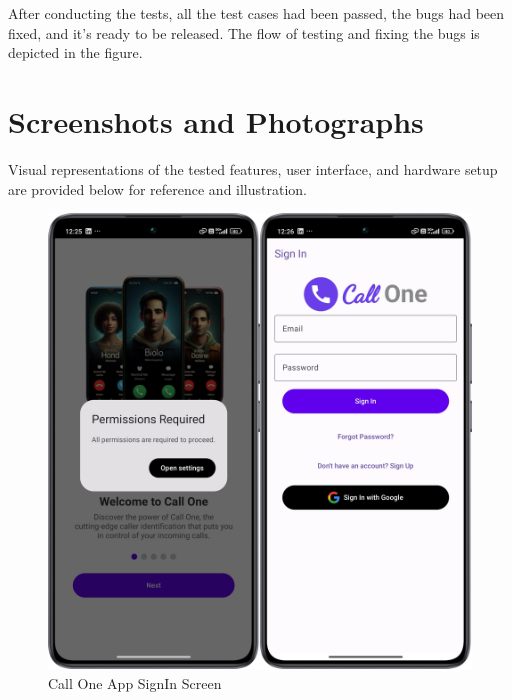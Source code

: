 After conducting the tests, all the test cases had been passed, the bugs had been fixed, and it's ready to be released.
The flow of testing and fixing the bugs is depicted in the figure.

\section{Screenshots and Photographs}\label{sec:screenshots-and-photographs}

Visual representations of the tested features, user interface, and hardware setup are provided below for reference and illustration.

\begin{figure}
    \centering
    \includegraphics[width=1\linewidth]{Media//whatsapp/signin}
    \caption{Call One App SignIn Screen}
    \label{fig:Call One App SignIn Screen}
\end{figure}

